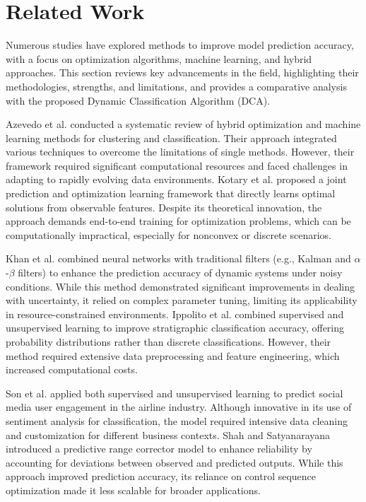 \section{Related Work}
Numerous studies have explored methods to improve model prediction accuracy, with a focus on optimization algorithms, machine learning, and hybrid approaches. This section reviews key advancements in the field, highlighting their methodologies, strengths, and limitations, and provides a comparative analysis with the proposed Dynamic Classification Algorithm (DCA).

Azevedo et al. \cite{azevedo2023} conducted a systematic review of hybrid optimization and machine learning methods for clustering and classification. Their approach integrated various techniques to overcome the limitations of single methods. However, their framework required significant computational resources and faced challenges in adapting to rapidly evolving data environments. Kotary et al. \cite{kotary2023} proposed a joint prediction and optimization learning framework that directly learns optimal solutions from observable features. Despite its theoretical innovation, the approach demands end-to-end training for optimization problems, which can be computationally impractical, especially for nonconvex or discrete scenarios.

Khan et al. \cite{khan2023} combined neural networks with traditional filters (e.g., Kalman and $\alpha$-$\beta$ filters) to enhance the prediction accuracy of dynamic systems under noisy conditions. While this method demonstrated significant improvements in dealing with uncertainty, it relied on complex parameter tuning, limiting its applicability in resource-constrained environments. Ippolito et al. \cite{ippolito2023} combined supervised and unsupervised learning to improve stratigraphic classification accuracy, offering probability distributions rather than discrete classifications. However, their method required extensive data preprocessing and feature engineering, which increased computational costs.

Son et al. \cite{son2023} applied both supervised and unsupervised learning to predict social media user engagement in the airline industry. Although innovative in its use of sentiment analysis for classification, the model required intensive data cleaning and customization for different business contexts. Shah and Satyanarayana \cite{shah2023} introduced a predictive range corrector model to enhance reliability by accounting for deviations between observed and predicted outputs. While this approach improved prediction accuracy, its reliance on control sequence optimization made it less scalable for broader applications.

